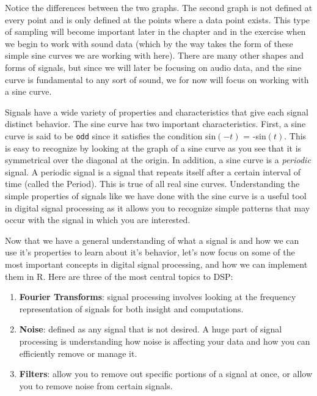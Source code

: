 \documentclass[]{krantz}
\providecommand{\tightlist}{%
  \setlength{\itemsep}{0pt}\setlength{\parskip}{0pt}}
\begin{document}
Notice the differences between the two graphs. The second graph is not
defined at every point and is only defined at the points where a data
point exists. This type of sampling will become important later in the
chapter and in the exercise when we begin to work with sound data (which
by the way takes the form of these simple sine curves we are working
with here). There are many other shapes and forms of signals, but since
we will later be focusing on audio data, and the sine curve is
fundamental to any sort of sound, we for now will focus on working with
a sine curve.

Signals have a wide variety of properties and characteristics that give
each signal distinct behavior. The sine curve has two important
characteristics. First, a sine curve is said to be \texttt{odd} since it
satisfies the condition sin\((-t)\) = -sin\((t)\). This is easy to
recognize by looking at the graph of a sine curve as you see that it is
symmetrical over the diagonal at the origin. In addition, a sine curve
is a \emph{periodic} signal. A periodic signal is a signal that repeats
itself after a certain interval of time (called the Period). This is
true of all real sine curves. Understanding the simple properties of
signals like we have done with the sine curve is a useful tool in
digital signal processing as it allows you to recognize simple patterns
that may occur with the signal in which you are interested.

Now that we have a general understanding of what a signal is and how we
can use it's properties to learn about it's behavior, let's now focus on
some of the most important concepts in digital signal processing, and
how we can implement them in R. Here are three of the most central
topics to DSP:

\begin{enumerate}
\def\labelenumi{\arabic{enumi}.}
\tightlist
\item
  \textbf{Fourier Transforms}: signal processing involves looking at the
  frequency representation of signals for both insight and computations.
\item
  \textbf{Noise}: defined as any signal that is not desired. A huge part
  of signal processing is understanding how noise is affecting your data
  and how you can efficiently remove or manage it.
\item
  \textbf{Filters}: allow you to remove out specific portions of a
  signal at once, or allow you to remove noise from certain signals.
\end{enumerate}
\end{document}
